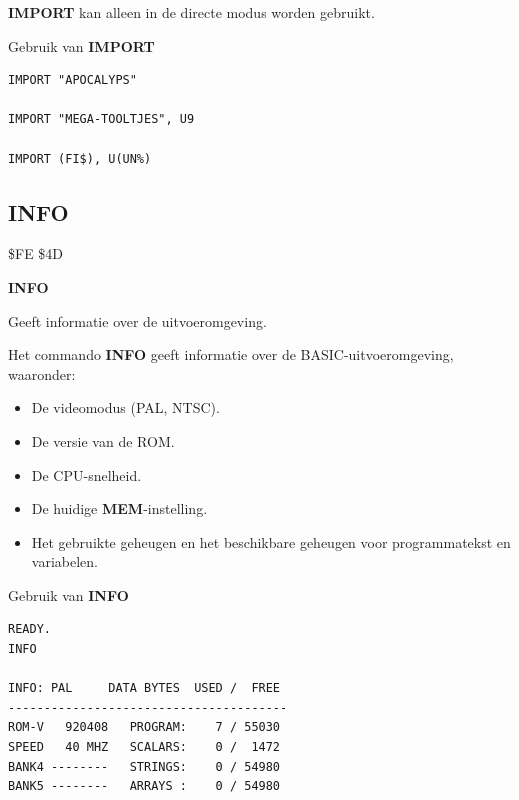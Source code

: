 \begin{description}[leftmargin=2cm,style=nextline]
                  {\bf IMPORT} kan alleen in de directe modus worden gebruikt.

\item [Voorbeelden:] Gebruik van {\bf IMPORT}

\begin{tcolorbox}[colback=black,coltext=white]
\verbatimfont{\codefont}
\begin{verbatim}
IMPORT "APOCALYPS"

IMPORT "MEGA-TOOLTJES", U9

IMPORT (FI$), U(UN%)
\end{verbatim}
\end{tcolorbox}
\end{description}


\newpage
\subsection{INFO}
\begin{description}[leftmargin=2cm,style=nextline]
\item [Token:]    \$FE \$4D

\item [Formaat:]   {\bf INFO}

\item [Gebruik:]    Geeft informatie over de uitvoeromgeving.

\item [Opmerkingen:]  Het commando {\bf INFO} geeft informatie over de BASIC-uitvoeromgeving, waaronder:

                  \begin{itemize}
                     \item De videomodus (PAL, NTSC).                     \item De versie van de ROM.                     \item De CPU-snelheid.                     \item De huidige {\bf MEM}-instelling.                     \item Het gebruikte geheugen en het beschikbare geheugen voor programmatekst en variabelen.
                  \end{itemize}

\item [Voorbeeld:]  Gebruik van {\bf INFO}

\begin{tcolorbox}[colback=black,coltext=white]
\verbatimfont{\codefont}
\begin{verbatim}
READY.
INFO

INFO: PAL     DATA BYTES  USED /  FREE
---------------------------------------
ROM-V   920408   PROGRAM:    7 / 55030
SPEED   40 MHZ   SCALARS:    0 /  1472
BANK4 --------   STRINGS:    0 / 54980
BANK5 --------   ARRAYS :    0 / 54980
\end{verbatim}
\end{tcolorbox}
\end{description}

